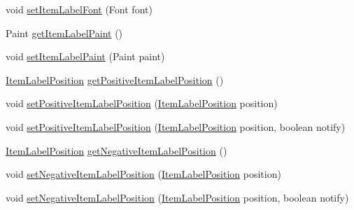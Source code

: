 \begin{DoxyCompactItemize}
void \mbox{\hyperlink{interfaceorg_1_1jfree_1_1chart_1_1renderer_1_1xy_1_1_x_y_item_renderer_afcd882e3d1ff5110045a614474cf4197}{set\+Item\+Label\+Font}} (Font font)
\item 
Paint \mbox{\hyperlink{interfaceorg_1_1jfree_1_1chart_1_1renderer_1_1xy_1_1_x_y_item_renderer_a39e6806273257e0c6a3169f9ba6eb131}{get\+Item\+Label\+Paint}} ()
\item 
void \mbox{\hyperlink{interfaceorg_1_1jfree_1_1chart_1_1renderer_1_1xy_1_1_x_y_item_renderer_aa7abb5be9a3273424f94b7ed2308b9ca}{set\+Item\+Label\+Paint}} (Paint paint)
\item 
\mbox{\hyperlink{classorg_1_1jfree_1_1chart_1_1labels_1_1_item_label_position}{Item\+Label\+Position}} \mbox{\hyperlink{interfaceorg_1_1jfree_1_1chart_1_1renderer_1_1xy_1_1_x_y_item_renderer_ac1193a36db00b567c752f769e6cdcbbc}{get\+Positive\+Item\+Label\+Position}} ()
\item 
void \mbox{\hyperlink{interfaceorg_1_1jfree_1_1chart_1_1renderer_1_1xy_1_1_x_y_item_renderer_ac7ef9149bff4cecf5acc82e9195922df}{set\+Positive\+Item\+Label\+Position}} (\mbox{\hyperlink{classorg_1_1jfree_1_1chart_1_1labels_1_1_item_label_position}{Item\+Label\+Position}} position)
\item 
void \mbox{\hyperlink{interfaceorg_1_1jfree_1_1chart_1_1renderer_1_1xy_1_1_x_y_item_renderer_a01118cdad6c5fc7ac2568508d4c99744}{set\+Positive\+Item\+Label\+Position}} (\mbox{\hyperlink{classorg_1_1jfree_1_1chart_1_1labels_1_1_item_label_position}{Item\+Label\+Position}} position, boolean notify)
\item 
\mbox{\hyperlink{classorg_1_1jfree_1_1chart_1_1labels_1_1_item_label_position}{Item\+Label\+Position}} \mbox{\hyperlink{interfaceorg_1_1jfree_1_1chart_1_1renderer_1_1xy_1_1_x_y_item_renderer_a31f2fac0ed8950f1958c7d7ec6dc1345}{get\+Negative\+Item\+Label\+Position}} ()
\item 
void \mbox{\hyperlink{interfaceorg_1_1jfree_1_1chart_1_1renderer_1_1xy_1_1_x_y_item_renderer_a68062ba8cb6465b1219f72ecc17a3c3b}{set\+Negative\+Item\+Label\+Position}} (\mbox{\hyperlink{classorg_1_1jfree_1_1chart_1_1labels_1_1_item_label_position}{Item\+Label\+Position}} position)
\item 
void \mbox{\hyperlink{interfaceorg_1_1jfree_1_1chart_1_1renderer_1_1xy_1_1_x_y_item_renderer_a0b86ebbd5d5e78880f670f464d2050e4}{set\+Negative\+Item\+Label\+Position}} (\mbox{\hyperlink{classorg_1_1jfree_1_1chart_1_1labels_1_1_item_label_position}{Item\+Label\+Position}} position, boolean notify)
\end{DoxyCompactItemize}


